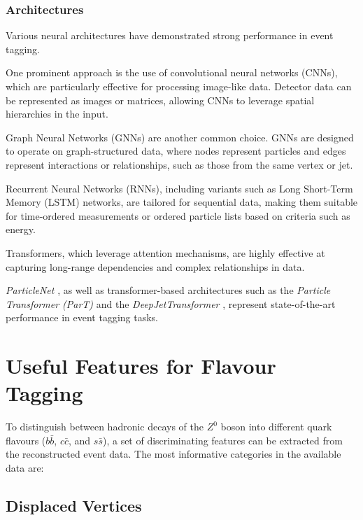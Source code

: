 \documentclass[11pt]{article}
\begin{document}
\subsubsection{Architectures}

Various neural architectures have demonstrated strong performance in event tagging.

One prominent approach is the use of convolutional neural networks (CNNs), which are particularly effective for processing image-like data. Detector data can be represented as images or matrices, allowing CNNs to leverage spatial hierarchies in the input.~\cite{Chekanov_2019, Aurisano_2016}

Graph Neural Networks (GNNs) are another common choice. GNNs are designed to operate on graph-structured data, where nodes represent particles and edges represent interactions or relationships, such as those from the same vertex or jet.~\cite{PhysRevD.110.032008}

Recurrent Neural Networks (RNNs), including variants such as Long Short-Term Memory (LSTM) networks, are tailored for sequential data, making them suitable for time-ordered measurements or ordered particle lists based on criteria such as energy.~\cite{app13053282}

Transformers, which leverage attention mechanisms, are highly effective at capturing long-range dependencies and complex relationships in data.

\textit{ParticleNet} \cite{Qu_2020}, as well as transformer-based architectures such as the \textit{Particle Transformer (ParT)} \cite{qu2024particletransformerjettagging} and the \textit{DeepJetTransformer} \cite{Blekman:2024wyf}, represent state-of-the-art performance in event tagging tasks.

\section{Useful Features for Flavour Tagging}

To distinguish between hadronic decays of the \( Z^0 \) boson into different quark flavours (\( b\bar{b} \), \( c\bar{c} \), and \( s\bar{s} \)), a set of discriminating features can be extracted from the reconstructed event data. The most informative categories in the available data are:

\subsection{Displaced Vertices}
\end{document}
